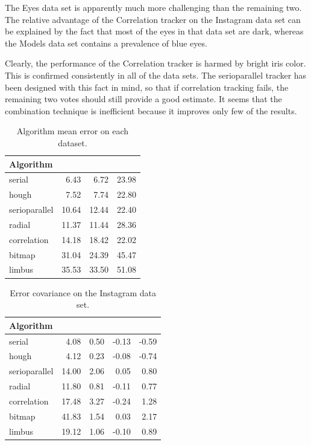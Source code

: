 The Eyes data set is apparently much more challenging than the remaining two.
The relative advantage of the Correlation tracker on the Instagram data set can be explained by the fact that most of the eyes in that data set are dark, whereas the Models data set contains a prevalence of blue eyes.

Clearly, the performance of the Correlation tracker is harmed by bright iris color.
This is confirmed consistently in all of the data sets.
The serioparallel tracker has been designed with this fact in mind, so that if correlation tracking fails, the remaining two votes should still provide a good estimate.
It seems that the combination technique is inefficient because it improves only few of the results.

\begin{table}[h]
\centering
\begin{tabular}{l@{\hspace{1.5cm}}D{.}{.}{3.2}D{.}{.}{3.2}D{.}{.}{3.2}}
\toprule
\textbf{Algorithm} &  &  & \\
\midrule
serial            & 6.43 &6.72 & 23.98 \\
hough           & 7.52 & 7.74& 22.80 \\
serioparallel & 10.64 & 12.44& 22.40  \\
radial           & 11.37 & 11.44&  28.36 \\
correlation   & 14.18 &18.42&22.02  \\
bitmap          & 31.04 & 24.39&  45.47 \\
limbus          & 35.53 &33.50 &51.08   \\
\bottomrule
\end{tabular}
\caption{Algorithm mean error on each dataset.}\label{t:algo-mean-data}
\end{table}

\begin{table}[h]
\centering
\begin{tabular}{l@{\hspace{1.5cm}}D{.}{.}{3.2}D{.}{.}{3.2}D{.}{.}{3.2}D{.}{.}{3.2}}
\toprule
\textbf{Algorithm} &  &  &  & \\
\midrule
serial & 4.08 & 0.50 & -0.13 & -0.59\\
hough & 4.12 & 0.23 & -0.08 & -0.74\\
serioparallel & 14.00 & 2.06 & 0.05 & 0.80\\
radial & 11.80 & 0.81 & -0.11 & 0.77\\
correlation & 17.48 & 3.27 & -0.24 & 1.28\\
bitmap & 41.83 & 1.54 & 0.03 & 2.17\\
limbus & 19.12 & 1.06 & -0.10 & 0.89\\
\bottomrule
\end{tabular}
\caption{Error covariance on the Instagram data set.}\label{t:algo-covar-instagram}
\end{table}


